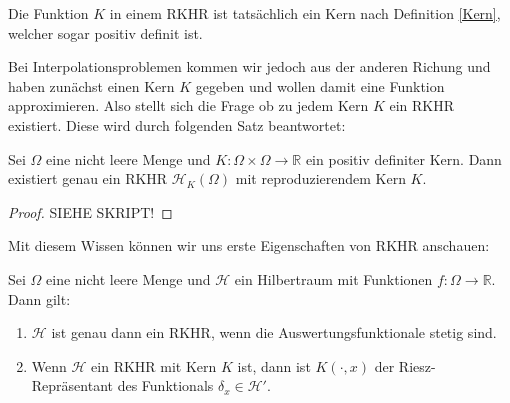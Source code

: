 \begin{remark}
Die Funktion $K$ in einem \ac{RKHR} ist tatsächlich ein Kern nach Definition \ref{Kern}, welcher sogar positiv definit ist.
\end{remark}

Bei Interpolationsproblemen kommen wir jedoch aus der anderen Richung und haben zunächst einen Kern $K$ gegeben und wollen damit eine Funktion approximieren. Also stellt sich die Frage ob zu jedem Kern $K$ ein \ac{RKHR} existiert. Diese wird durch folgenden Satz beantwortet:

\begin{theorem}
Sei $\Omega$ eine nicht leere Menge und $K:\Omega \times \Omega \rightarrow \mathbb{R}$ ein positiv definiter Kern. Dann existiert genau ein \ac{RKHR} $\mathcal{H}_K (\Omega)$ mit reproduzierendem Kern $K$.
\end{theorem}
\begin{proof}
SIEHE SKRIPT!
\end{proof}

Mit diesem Wissen können wir uns erste Eigenschaften von \ac{RKHR} anschauen:

\begin{theorem}
\label{stetig}
Sei $\Omega$ eine nicht leere Menge und $\mathcal{H}$ ein Hilbertraum mit Funktionen $f: \Omega \rightarrow \mathbb{R}$. Dann gilt:
\begin{enumerate}
\item \label{stetig1} $\mathcal{H}$ ist genau dann ein \ac{RKHR}, wenn die Auswertungsfunktionale stetig sind.
\item \label{stetig2} Wenn $\mathcal{H}$ ein \ac{RKHR} mit Kern $K$ ist, dann ist $K(\cdot,x)$ der Riesz-Repräsentant des Funktionals $\delta_x \in \mathcal{H}'$.
\end{enumerate}
\end{theorem}

